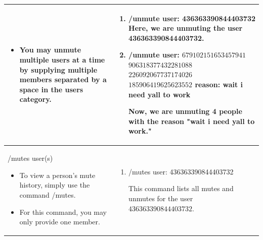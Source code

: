\documentclass{scrartcl}
\begin{document}
\begin{tabularx}{\textwidth}{|>{\raggedright\arraybackslash}X|>{\raggedright\arraybackslash}X|}
\begin{itemize}
    \item You may unmute multiple users at a time by supplying multiple members separated by a space in the users category. 
\end{itemize}&
\begin{enumerate}
    \item /unmute \color{black} user: \color{gray} 436363390844403732 \color{black}
    Here, we are unmuting the user 436363390844403732.
    
    \item /unmute \color{black} user: \color{gray} $679102151653457941$ $906318377432281088$ $226092067737174026$ $185906419625623552$ \color{black} reason: \color{gray} wait i need yall to work \color{black}
    
    Now, we are unmuting 4 people with the reason "wait i need yall to work."
\end{enumerate}
\\
\hline
/mutes user(s)
\begin{itemize}
    \item To view a person's mute history, simply use the command /mutes.
    \item For this command, you may only provide one member.
\end{itemize}&
\begin{enumerate}
    \item /mutes user: \color{gray}436363390844403732\color{black}
    
    This command lists all mutes and unmutes for the user $436363390844403732.$
\end{enumerate}\\
\hline
\end{tabularx}
\end{document}
